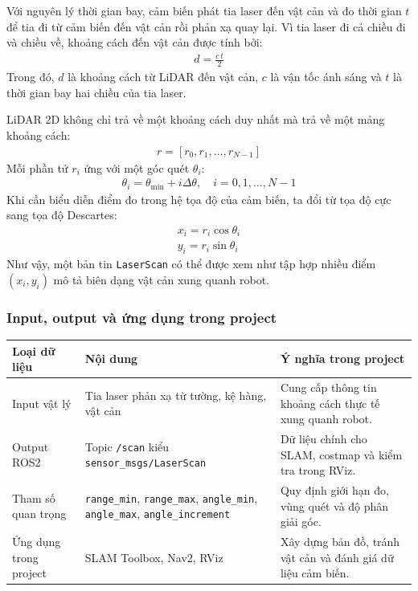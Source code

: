 Với nguyên lý thời gian bay, cảm biến phát tia laser đến vật cản và đo
thời gian \(t\) để tia đi từ cảm biến đến vật cản rồi phản xạ quay lại.
Vì tia laser đi cả chiều đi và chiều về, khoảng cách đến vật cản được
tính bởi:
\begin{gather*}d = \frac{c\, t}{2}\end{gather*}
Trong đó, \(d\) là khoảng cách từ LiDAR đến vật cản, \(c\) là vận tốc
ánh sáng và \(t\) là thời gian bay hai chiều của tia laser.

LiDAR 2D không chỉ trả về một khoảng cách duy nhất mà trả về một mảng
khoảng cách:
\begin{gather*}r = \left\lbrack r_{0},r_{1},\ldots,r_{N - 1} \right\rbrack\end{gather*}
Mỗi phần tử \(r_{i}\) ứng với một góc quét \(\theta_{i}\):
\begin{gather*}\theta_{i} = \theta_{\min} + i\Delta\theta,\quad i = 0,1,\ldots,N - 1\end{gather*}
Khi cần biểu diễn điểm đo trong hệ tọa độ của cảm biến, ta đổi từ tọa độ
cực sang tọa độ Descartes:
\begin{gather*}x_{i} = r_{i}\cos\theta_{i} \\[1.5ex]
y_{i} = r_{i}\sin\theta_{i}\end{gather*}
Như vậy, một bản tin \texttt{LaserScan} có thể được xem như tập hợp
nhiều điểm \(\left( x_{i},y_{i} \right)\) mô tả biên dạng vật cản xung
quanh robot.

\subsubsection{Input, output và ứng dụng trong project}

\renewcommand{\arraystretch}{1.25}
\begin{longtable}{|
  >{\raggedright\arraybackslash}p{}|
  >{\raggedright\arraybackslash}p{}|
  >{\raggedright\arraybackslash}p{}|}
\hline
\textbf{Loại dữ liệu} & \textbf{Nội dung} & \textbf{Ý nghĩa trong project} \\ \hline
\hline
\endhead
\hline
\endlastfoot
Input vật lý & Tia laser phản xạ từ tường, kệ hàng, vật cản & Cung cấp
thông tin khoảng cách thực tế xung quanh robot. \\ \hline
Output ROS2 & Topic \texttt{/scan} kiểu \texttt{sensor\_msgs/LaserScan}
& Dữ liệu chính cho SLAM, costmap và kiểm tra trong RViz. \\ \hline
Tham số quan trọng & \texttt{range\_min}, \texttt{range\_max},
\texttt{angle\_min}, \texttt{angle\_max}, \texttt{angle\_increment} &
Quy định giới hạn đo, vùng quét và độ phân giải góc. \\ \hline
Ứng dụng trong project & SLAM Toolbox, Nav2, RViz & Xây dựng bản đồ,
tránh vật cản và đánh giá dữ liệu cảm biến. \\ \hline
\end{longtable}

